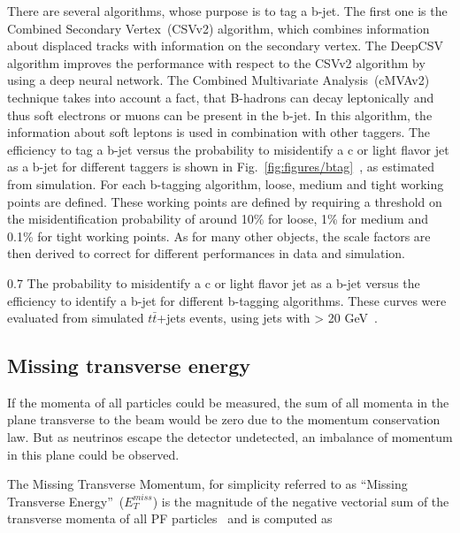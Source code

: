 There are several algorithms, whose purpose is to tag a b-jet. The first one is the Combined Secondary Vertex~(CSVv2) algorithm, which combines information about displaced tracks with information on the secondary vertex. The DeepCSV algorithm improves the performance with respect to the CSVv2 algorithm by using a deep neural network. The Combined Multivariate Analysis~(cMVAv2) technique takes into account a fact, that B-hadrons can decay leptonically and thus soft electrons or muons can be present in the b-jet. In this algorithm, the information about soft leptons is used in combination with other taggers. The efficiency to tag a b-jet versus the probability to misidentify a c or light flavor jet as a b-jet for different taggers is shown in Fig.~\ref{fig:figures/btag}~\cite{Sirunyan:2017ezt}, as estimated from simulation. For each b-tagging algorithm, loose, medium and tight working points are defined. These working points are defined by requiring a threshold on the misidentification probability of around 10\% for loose, 1\% for medium and 0.1\% for tight working points. As for many other objects, the scale factors are then derived to correct for different performances in data and simulation.


                 {0.7}       %
                 { The probability to misidentify a c or light flavor jet as a b-jet versus the efficiency to identify a b-jet for different b-tagging algorithms. These curves were evaluated from simulated $t\bar{t}$+jets events, using jets with \pt > 20 GeV~\cite{Sirunyan:2017ezt}. }


\subsection{Missing transverse energy~\label{sec:MET}}


If the momenta of all particles could be measured, the sum of all momenta in the plane transverse to the beam would be zero due to the momentum conservation law. But as neutrinos escape the detector undetected, an imbalance of momentum in this plane could be observed. 

The Missing Transverse Momentum, for simplicity referred to as ``Missing Transverse Energy''~($E_{T}^{miss}$) is the magnitude of the negative vectorial sum of the transverse momenta of all PF particles~\cite{CMS:2016ljj} and is computed as

